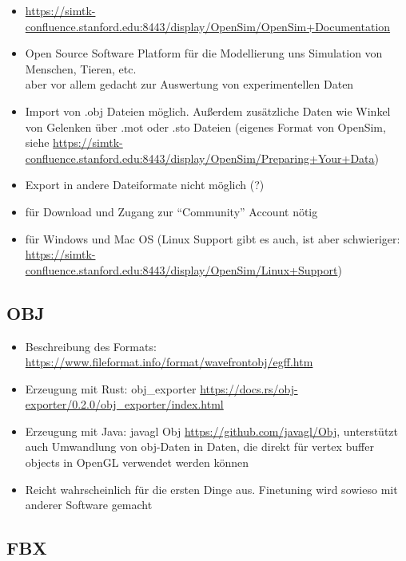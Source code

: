 \begin{itemize}
 \item \url{https://simtk-confluence.stanford.edu:8443/display/OpenSim/OpenSim+Documentation}
 \item Open Source Software Platform für die Modellierung uns Simulation von Menschen, Tieren, etc.\\
 aber vor allem gedacht zur Auswertung von experimentellen Daten
 \item Import von .obj Dateien möglich. Außerdem zusätzliche Daten wie Winkel von Gelenken über .mot oder .sto Dateien (eigenes Format von OpenSim, siehe \url{https://simtk-confluence.stanford.edu:8443/display/OpenSim/Preparing+Your+Data})
 \item Export in andere Dateiformate nicht möglich (?)
 \item für Download und Zugang zur "`Community"' Account nötig
 \item für Windows und Mac OS (Linux Support gibt es auch, ist aber schwieriger: \url{https://simtk-confluence.stanford.edu:8443/display/OpenSim/Linux+Support})
\end{itemize}


\subsection{OBJ}

\begin{itemize}
 \item Beschreibung des Formats: \url{https://www.fileformat.info/format/wavefrontobj/egff.htm}
 \item Erzeugung mit Rust: obj\_exporter \url{https://docs.rs/obj-exporter/0.2.0/obj_exporter/index.html}
 \item Erzeugung mit Java: javagl Obj \url{https://github.com/javagl/Obj}, unterstützt auch Umwandlung von obj-Daten in Daten, die direkt für vertex buffer objects in OpenGL verwendet werden können
 \item Reicht wahrscheinlich für die ersten Dinge aus. Finetuning wird sowieso mit anderer Software gemacht
\end{itemize}

\subsection{FBX}

